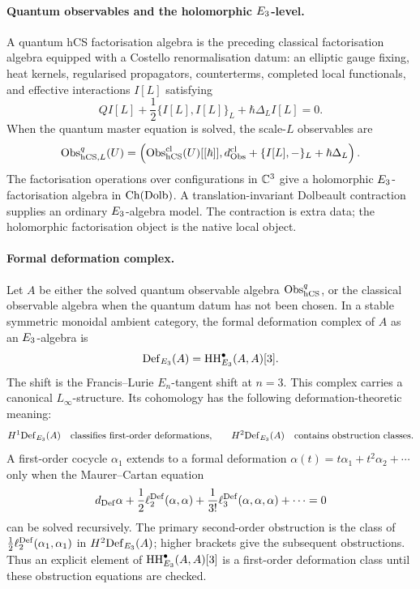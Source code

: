 \paragraph{Quantum observables and the holomorphic \(E_3\)-level.}
A quantum hCS factorisation algebra is the preceding classical
factorisation algebra equipped with a Costello renormalisation datum:
an elliptic gauge fixing, heat kernels, regularised propagators,
counterterms, completed local functionals, and effective interactions
\(I[L]\) satisfying
\[
  QI[L]+\frac12\{I[L],I[L]\}_L+\hbar\Delta_LI[L]=0.
\]
When the quantum master equation is solved, the scale-\(L\) observables
are
\[
  \mathrm{Obs}^q_{\mathrm{hCS},L}(U)
  =
  \left(
  \mathrm{Obs}^{\mathrm{cl}}_{\mathrm{hCS}}(U)[[\hbar]],
  d_{\mathrm{Obs}}^{\mathrm{cl}}+\{I[L],-\}_L+\hbar\Delta_L
  \right).
\]
The factorisation operations over configurations in \(\mathbb{C}^3\) give a
holomorphic \(E_3\)-factorisation algebra in \(\mathrm{Ch}(\mathrm{Dolb})\). A
translation-invariant Dolbeault contraction supplies an ordinary
\(E_3\)-algebra model. The contraction is extra data; the
holomorphic factorisation object is the native local object.

\paragraph{Formal deformation complex.}
Let \(A\) be either the solved quantum observable algebra
\(\mathrm{Obs}^q_{\mathrm{hCS}}\), or the classical observable algebra when the
quantum datum has not been chosen. In a stable symmetric monoidal
ambient category, the formal deformation complex of \(A\) as an
\(E_3\)-algebra is
\[
  \mathrm{Def}_{E_3}(A)
  =
  \mathrm{HH}^\bullet_{E_3}(A,A)[3].
\]
The shift is the Francis--Lurie \(E_n\)-tangent shift at \(n=3\).
This complex carries a canonical \(L_\infty\)-structure. Its
cohomology has the following deformation-theoretic meaning:
\[
  H^1\mathrm{Def}_{E_3}(A)
  \quad\hbox{classifies first-order deformations,}
  \qquad
  H^2\mathrm{Def}_{E_3}(A)
  \quad\hbox{contains obstruction classes.}
\]
A first-order cocycle \(\alpha_1\) extends to a formal deformation
\(\alpha(t)=t\alpha_1+t^2\alpha_2+\cdots\) only when the Maurer--Cartan
equation
\[
  d_{\mathrm{Def}}\alpha
  +\frac12\ell_2^{\mathrm{Def}}(\alpha,\alpha)
  +\frac1{3!}\ell_3^{\mathrm{Def}}(\alpha,\alpha,\alpha)
  +\cdots
  =0
\]
can be solved recursively. The primary second-order obstruction is the
class of \(\frac12\ell_2^{\mathrm{Def}}(\alpha_1,\alpha_1)\) in
\(H^2\mathrm{Def}_{E_3}(A)\); higher brackets give the subsequent
obstructions. Thus an explicit element of
\(\mathrm{HH}^\bullet_{E_3}(A,A)[3]\) is a first-order deformation class
until these obstruction equations are checked.

